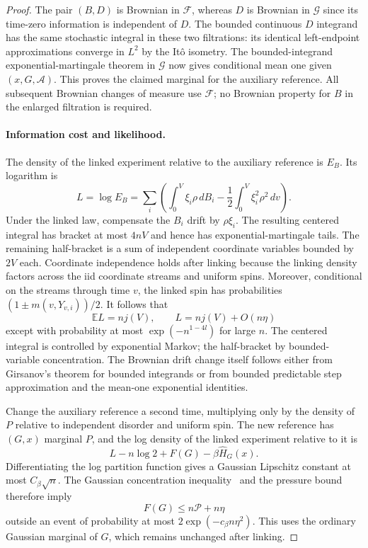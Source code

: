 \begin{proof}
The pair $(B,D)$ is Brownian in $\mathcal F$, whereas $D$ is
Brownian in $\mathcal G$ since its time-zero information is
independent of $D$. The bounded continuous $D$ integrand has the
same stochastic integral in these two filtrations: its identical
left-endpoint approximations converge in $L^2$ by the It\^o isometry.
The bounded-integrand exponential-martingale theorem in $\mathcal G$
now gives conditional mean one given $(x,G,\mathcal A)$.
This proves the claimed marginal for the auxiliary reference.
All subsequent Brownian changes of measure use $\mathcal F$;
no Brownian property for $B$ in the enlarged filtration is required.

\paragraph{Information cost and likelihood.}
The density of the linked experiment relative to the auxiliary
reference is $E_B$. Its logarithm is
\[
 L=\log E_B=\sum_i\left(\int_0^V\xi_i\rho\,dB_i
                  -\frac12\int_0^V\xi_i^2\rho^2\,dv\right).
\]
Under the linked law, compensate the $B_i$ drift by $\rho\xi_i$.
The resulting centered integral has bracket at most $4nV$ and hence
has exponential-martingale tails. The remaining half-bracket is a sum
of independent coordinate variables bounded by $2V$ each. Coordinate
independence holds after linking because the linking density factors
across the iid coordinate streams and uniform spins. Moreover,
conditional on the streams through time $v$, the linked spin has
probabilities $(1\pm m(v,Y_{v,i}))/2$. It follows that
\[
 \mathbb E L=nj(V),\qquad L=nj(V)+O(n\eta)
\]
except with probability at most $\exp(-n^{1-4l})$ for large $n$.
The centered integral is controlled by exponential Markov; the
half-bracket by bounded-variable concentration. The Brownian drift
change itself follows either from Girsanov's theorem for bounded
integrands or from bounded predictable step approximation and the
mean-one exponential identities.

Change the auxiliary reference a second time, multiplying only by the
density of $P$ relative to independent disorder and uniform spin.
The new reference has $(G,x)$ marginal $P$, and the log density of
the linked experiment relative to it is
\[
 L-n\log2+F(G)-\beta\widehat H_G(x).
\]
Differentiating the log partition function gives a Gaussian Lipschitz
constant at most $C_\beta\sqrt n$. The Gaussian concentration
inequality~\cite[Section~5.4, Theorem~5.6]{BLM2013} and the pressure bound
therefore imply
\[
 F(G)\le n\mathcal P+n\eta
\]
outside an event of probability at most
$2\exp(-c_\beta n\eta^2)$. This uses the ordinary Gaussian marginal
of $G$, which remains unchanged after linking.


\end{proof}
